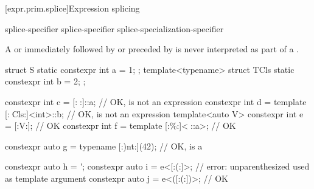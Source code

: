 [expr.prim.splice]{Expression splicing}

\begin{bnf}
\br
    splice-specifier\br
     splice-specifier\br
     splice-specialization-specifier
\end{bnf}

\pnum
A 
or 
immediately followed by \tcode{::} or preceded by 
is never interpreted as part of a .
\begin{example}
\begin{codeblock}
struct S { static constexpr int a = 1; };
template<typename> struct TCls { static constexpr int b = 2; };

constexpr int c = [:^^S:]::a;                   // OK,  is not an expression
constexpr int d = template [:^^TCls:]<int>::b;  // OK,  is not an expression
template<auto V> constexpr int e = [:V:];       // OK
constexpr int f = template [:^^e:]<^^S::a>;     // OK

constexpr auto g = typename [:^^int:](42);      // OK,  is a 

constexpr auto h = ^^g;
constexpr auto i = e<[:^^h:]>;          // error: unparenthesized  used as template argument
constexpr auto j = e<([:^^h:])>;        // OK
\end{codeblock}
\end{example}


